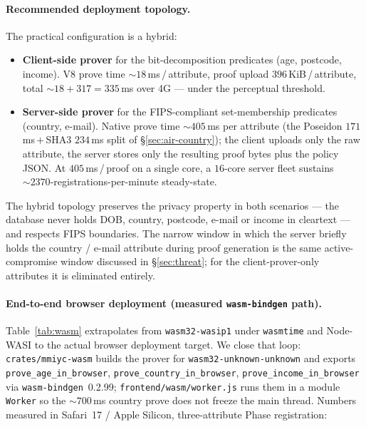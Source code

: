 \documentclass[11pt,a4paper]{article}
\begin{document}
\paragraph{Recommended deployment topology.}  The
practical configuration is a hybrid:

\begin{itemize}
  \item \textbf{Client\nobreakdash-side prover} for the
        bit\nobreakdash-decomposition predicates (age, postcode,
        income).  V8 prove time $\sim\!\num{18}$\,ms\,/\,attribute,
        proof upload $\num{396}$\,KiB\,/\,attribute, total
        $\sim\!\num{18} + \num{317} = \num{335}$\,ms over
        4G — under the perceptual threshold.
  \item \textbf{Server\nobreakdash-side prover} for the
        FIPS\nobreakdash-compliant set\nobreakdash-membership
        predicates (country, e\nobreakdash-mail).  Native
        prove time $\sim\!\num{405}$\,ms per attribute (the
        Poseidon $\num{171}$\,ms\,$+$\,SHA3 $\num{234}$\,ms split
        of \S\ref{sec:air-country}); the client uploads only
        the raw attribute, the server stores only the resulting
        proof bytes plus the policy JSON.  At
        $\num{405}$\,ms\,/\,proof on a single core, a $\num{16}$\nobreakdash-core
        server fleet sustains
        $\sim\!\num{2370}$\nobreakdash-registrations\nobreakdash-per\nobreakdash-minute
        steady\nobreakdash-state.
\end{itemize}

The hybrid topology preserves the privacy property in both
scenarios — the database never holds DOB, country, postcode,
e\nobreakdash-mail or income in cleartext — and respects FIPS
boundaries.  The narrow window in which the server briefly
holds the country / e\nobreakdash-mail attribute during proof
generation is the same active\nobreakdash-compromise window
discussed in \S\ref{sec:threat}; for the
client\nobreakdash-prover\nobreakdash-only attributes it is
eliminated entirely.

\paragraph{End\nobreakdash-to\nobreakdash-end browser deployment
(measured \texttt{wasm-bindgen} path).}  Table~\ref{tab:wasm}
extrapolates from \texttt{wasm32-wasip1} under \texttt{wasmtime}
and Node\nobreakdash-WASI to the actual browser deployment
target.  We close that loop: \texttt{crates/mmiyc-wasm}
builds the prover for \texttt{wasm32-unknown-unknown} and exports
\texttt{prove\_age\_in\_browser},
\texttt{prove\_country\_in\_browser},
\texttt{prove\_income\_in\_browser} via \texttt{wasm-bindgen}~0.2.99;
\texttt{frontend/wasm/worker.js} runs them in a module
\texttt{Worker} so the $\sim\!\num{700}$\,ms country prove does not
freeze the main thread.  Numbers measured in Safari~17 / Apple
Silicon, three\nobreakdash-attribute Phase
registration:
\end{document}
